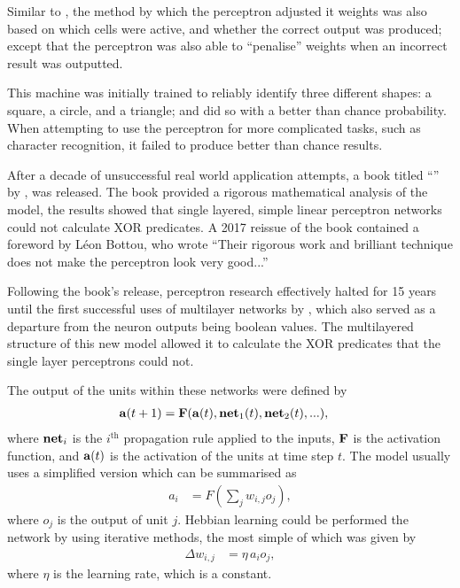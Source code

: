 Similar to \cite{Farley:1954:Simulation}, the method by which the perceptron
adjusted it weights was also based on which cells were active, and whether the
correct output was produced; except that the perceptron was also able to
``penalise'' weights when an incorrect result was outputted.

This machine was initially trained to reliably identify three different shapes:
a square, a circle, and a triangle; and did so with a better than chance
probability.
When attempting to use the perceptron for more complicated tasks, such as
character recognition, it failed to produce better than chance results.

After a decade of unsuccessful real world application attempts, a book titled
``'' by \cite{Minsky:1969:Perceptrons}, was
released.
The book provided a rigorous mathematical analysis of the model, the results
showed that single layered, simple linear perceptron networks could not
calculate XOR predicates.
A 2017 reissue of the book contained a foreword by L\'eon Bottou, who wrote
``Their rigorous work and brilliant technique does not make the perceptron look
very good...''

Following the book's release, perceptron research effectively halted for 15
years until the first successful uses of multilayer networks by
\cite{McClelland:1986:Parallel}, which also served as a departure from the
neuron outputs being boolean values.
The multilayered structure of this new model allowed it to calculate the XOR
predicates that the single layer perceptrons could not.

The output of the units within these networks were defined by
\begin{align*}
    \mathbf{a}(t+1) &= \mathbf{F}(\mathbf{a}(t),\mathbf{net}_1(t),\mathbf{net}_2(t),...),
\end{align*}
where $\mathbf{net}_i$ is the $i^\text{th}$ propagation rule applied to the
inputs, $\mathbf{F}$ is the activation function, and $\mathbf{a}(t)$ is the
activation of the units at time step $t$.
The model usually uses a simplified version which can be summarised as
\begin{align*}
    a_i &= F\left(\sum_j w_{i,j}o_j\right),
\end{align*}
where $o_j$ is the output of unit $j$.
Hebbian learning could be performed the network by using iterative methods,
the most simple of which was given by
\begin{align*}
    \Delta w_{i,j} &= \eta\,a_i o_j,
\end{align*}
where $\eta$ is the learning rate, which is a constant.

